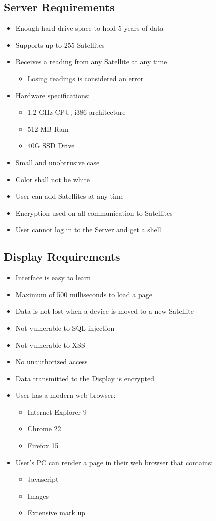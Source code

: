 \subsection{Server Requirements}
\begin{itemize}
	\item Enough hard drive space to hold 5 years of data
	\item Supports up to 255 Satellites
	\item Receives a reading from any Satellite at any time
	\begin{itemize}
		\item Losing readings is considered an error
	\end{itemize}
	\item Hardware specifications:
	\begin{itemize}
		\item 1.2 GHz CPU, i386 architecture
		\item 512 MB Ram
		\item 40G SSD Drive
	\end{itemize}
	\item Small and unobtrusive case
	\item Color shall not be white
	\item User can add Satellites at any time
	\item Encryption used on all communication to Satellites
	\item User cannot log in to the Server and get a shell
\end{itemize}

\subsection{Display Requirements}
\begin{itemize}
 	\item Interface is easy to learn
 	\item Maximum of 500 milliseconds to load a page
	\item Data is not lost when a device is moved to a new Satellite
	\item Not vulnerable to SQL injection
	\item Not vulnerable to XSS
	\item No unauthorized access
	\item Data transmitted to the Display is encrypted
	\item User has a modern web browser:
	\begin{itemize}
		\item Internet Explorer 9
		\item Chrome 22
		\item Firefox 15
	\end{itemize}
	\item User's PC can render a page in their web browser that contains:
	\begin{itemize}
		\item Javascript
		\item Images
		\item Extensive mark up
	\end{itemize}
\end{itemize}